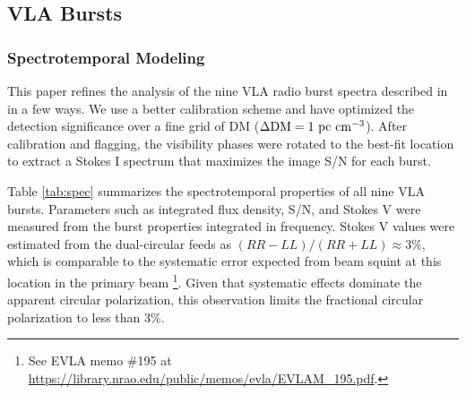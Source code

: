 \documentclass[twocolumn]{aastex61}
\begin{document}
\subsection{VLA Bursts}

\subsubsection{Spectrotemporal Modeling}
\label{sec:spec}

This paper refines the analysis of the nine VLA radio burst spectra described in \citet{LOC} in a few ways. We use a better calibration scheme and have optimized the detection significance over a fine grid of DM ($\Delta \rm{DM}=1\ \rm{pc}\ \rm{cm}^{-3}$). After calibration and flagging, the visibility phases were rotated to the best-fit location \citep[RA, Dec $=$ 05h31m58.70s, +33d08m52.5s;][]{LOC} to extract a Stokes I spectrum that maximizes the image S/N for each burst.

Table \ref{tab:spec} summarizes the spectrotemporal properties of all nine VLA bursts. Parameters such as integrated flux density, S/N, and Stokes V were measured from the burst properties integrated in frequency. Stokes V values were estimated from the dual-circular feeds as $(RR-LL)/(RR+LL)\approx3\%$, which is comparable to the systematic error expected from beam squint at this location in the primary beam \footnote{See EVLA memo \#195 at \url{https://library.nrao.edu/public/memos/evla/EVLAM_195.pdf}.}. Given that systematic effects dominate the apparent circular polarization, this observation limits the fractional circular polarization to less than 3\%.
\end{document}

